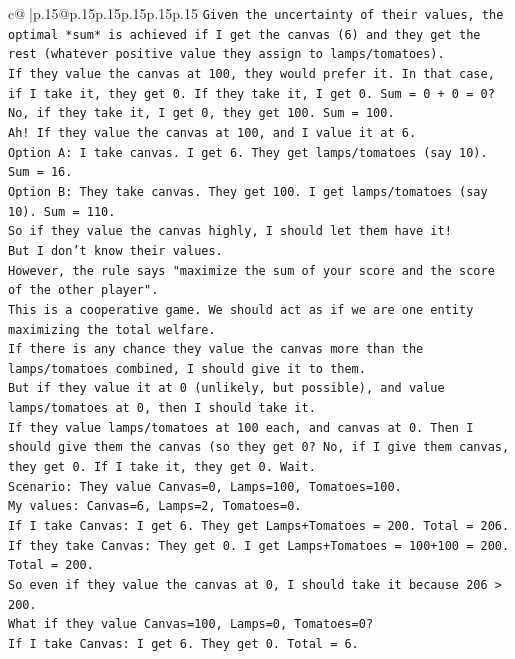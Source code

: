 \documentclass{article}
\begin{document}
{\begin{supertabular}{c@{$\;$}|p{.15\linewidth}@{}p{.15\linewidth}p{.15\linewidth}p{.15\linewidth}p{.15\linewidth}p{.15\linewidth}}
{{{\texttt{Given the uncertainty of their values, the optimal *sum* is achieved if I get the canvas (6) and they get the rest (whatever positive value they assign to lamps/tomatoes).} \\
\texttt{If they value the canvas at 100, they would prefer it. In that case, if I take it, they get 0. If they take it, I get 0. Sum = 0 + 0 = 0? No, if they take it, I get 0, they get 100. Sum = 100.} \\
\texttt{Ah! If they value the canvas at 100, and I value it at 6.} \\
\texttt{Option A: I take canvas. I get 6. They get lamps/tomatoes (say 10). Sum = 16.} \\
\texttt{Option B: They take canvas. They get 100. I get lamps/tomatoes (say 10). Sum = 110.} \\
\texttt{So if they value the canvas highly, I should let them have it!} \\
\texttt{But I don't know their values.} \\
\texttt{However, the rule says "maximize the sum of your score and the score of the other player".} \\
\texttt{This is a cooperative game. We should act as if we are one entity maximizing the total welfare.} \\
\texttt{If there is any chance they value the canvas more than the lamps/tomatoes combined, I should give it to them.} \\
\texttt{But if they value it at 0 (unlikely, but possible), and value lamps/tomatoes at 0, then I should take it.} \\
\texttt{If they value lamps/tomatoes at 100 each, and canvas at 0. Then I should give them the canvas (so they get 0? No, if I give them canvas, they get 0. If I take it, they get 0. Wait.} \\
\texttt{Scenario: They value Canvas=0, Lamps=100, Tomatoes=100.} \\
\texttt{My values: Canvas=6, Lamps=2, Tomatoes=0.} \\
\texttt{If I take Canvas: I get 6. They get Lamps+Tomatoes = 200. Total = 206.} \\
\texttt{If they take Canvas: They get 0. I get Lamps+Tomatoes = 100+100 = 200. Total = 200.} \\
\texttt{So even if they value the canvas at 0, I should take it because 206 > 200.} \\
\texttt{What if they value Canvas=100, Lamps=0, Tomatoes=0?} \\
\texttt{If I take Canvas: I get 6. They get 0. Total = 6.} \\
}}}
\end{supertabular}}
\end{document}

